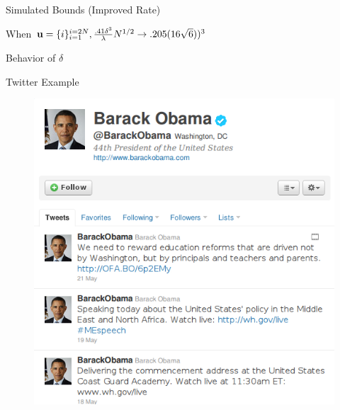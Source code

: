 \documentclass{beamer}
\begin{document}
\begin{frame}{Simulated Bounds (Improved Rate)}
  \begin{center}
    \resizebox{10.0cm}{!}{
      
    }
  \end{center}
  \pause
  When ${\bf u} = \{i\}_{i=1}^{i=2N}, \frac{.41 \delta^3}{\lambda}N^{1/2} \to .205(16\sqrt{6}))^3$
\end{frame}

\begin{frame}{Behavior of $\delta$}
  \begin{center}
    \resizebox{10.0cm}{!}{
      
    }
  \end{center}
\end{frame}

\begin{frame}{Twitter Example}
  \begin{figure}[!ht]
   \centering
   \includegraphics[scale=.3]{pres3.png}

\end{figure}
\end{frame}
\end{document}
